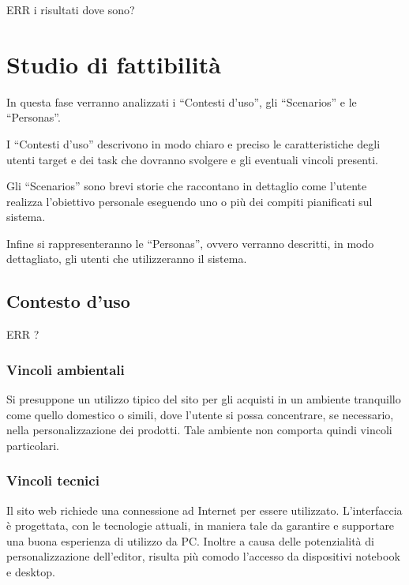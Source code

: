 \documentclass[12pt,italian,]{report}
\begin{document}
ERR i risultati dove sono?

\hypertarget{studio-di-fattibilituxe0}{%
\chapter{Studio di fattibilità}\label{studio-di-fattibilituxe0}}

In questa fase verranno analizzati i ``Contesti d'uso'', gli
``Scenarios'' e le ``Personas''.

I ``Contesti d'uso'' descrivono in modo chiaro e preciso le
caratteristiche degli utenti target e dei task che dovranno svolgere e
gli eventuali vincoli presenti.

Gli ``Scenarios'' sono brevi storie che raccontano in dettaglio come
l'utente realizza l'obiettivo personale eseguendo uno o più dei compiti
pianificati sul sistema.

Infine si rappresenteranno le ``Personas'', ovvero verranno descritti,
in modo dettagliato, gli utenti che utilizzeranno il sistema.

\hypertarget{contesto-duso}{%
\section{Contesto d'uso}\label{contesto-duso}}

ERR ?

\hypertarget{vincoli-ambientali}{%
\subsection{Vincoli ambientali}\label{vincoli-ambientali}}

Si presuppone un utilizzo tipico del sito per gli acquisti in un
ambiente tranquillo come quello domestico o simili, dove l'utente si
possa concentrare, se necessario, nella personalizzazione dei prodotti.
Tale ambiente non comporta quindi vincoli particolari.

\hypertarget{vincoli-tecnici}{%
\subsection{Vincoli tecnici}\label{vincoli-tecnici}}

Il sito web richiede una connessione ad Internet per essere utilizzato.
L'interfaccia è progettata, con le tecnologie attuali, in maniera tale
da garantire e supportare una buona esperienza di utilizzo da PC.
Inoltre a causa delle potenzialità di personalizzazione dell'editor,
risulta più comodo l'accesso da dispositivi notebook e desktop.
\end{document}
